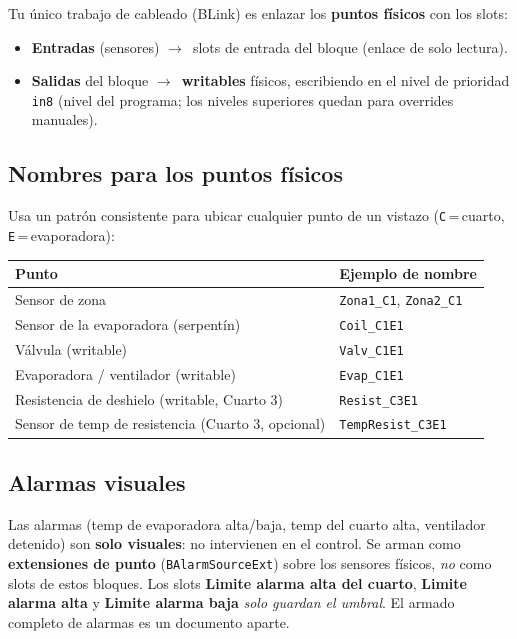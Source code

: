 \documentclass[11pt,a4paper]{article}
\newcommand{\ra}{\textcolor{frio}{$\rightarrow$}}
\newcommand{\slot}[1]{\textbf{#1}}
\newcommand{\code}[1]{\texttt{#1}}
\newcommand{\cabfila}{\color{white}\bfseries}
\begin{document}
\noindent Tu único trabajo de cableado (BLink) es enlazar los \textbf{puntos físicos} con los slots:
\begin{itemize}[leftmargin=1.4em,itemsep=2pt]
  \item \textbf{Entradas} (sensores) \ra\ slots de entrada del bloque (enlace de solo lectura).
  \item \textbf{Salidas} del bloque \ra\ \textbf{writables} físicos, escribiendo en el nivel de
        prioridad \code{in8} (nivel del programa; los niveles superiores quedan para overrides manuales).
\end{itemize}

\subsection{Nombres para los puntos físicos}
Usa un patrón consistente para ubicar cualquier punto de un vistazo (\code{C}\,=\,cuarto, \code{E}\,=\,evaporadora):

\begin{center}\small
\begin{tabular}{L{6.5cm} L{6.5cm}}
\toprule
{}\cabfila \textbf{Punto} & \cabfila \textbf{Ejemplo de nombre} \\
\midrule
{}Sensor de zona & \code{Zona1_C1}, \code{Zona2_C1} \\
Sensor de la evaporadora (serpentín) & \code{Coil_C1E1} \\
Válvula (writable) & \code{Valv_C1E1} \\
Evaporadora / ventilador (writable) & \code{Evap_C1E1} \\
Resistencia de deshielo (writable, Cuarto 3) & \code{Resist_C3E1} \\
Sensor de temp de resistencia (Cuarto 3, opcional) & \code{TempResist_C3E1} \\
\bottomrule
\end{tabular}
\end{center}

\subsection{Alarmas visuales}
\begin{nota}
Las alarmas (temp de evaporadora alta/baja, temp del cuarto alta, ventilador detenido) son
\textbf{solo visuales}: no intervienen en el control. Se arman como \textbf{extensiones de punto}
(\code{BAlarmSourceExt}) sobre los sensores físicos, \emph{no} como slots de estos bloques.
Los slots \slot{Limite alarma alta del cuarto}, \slot{Limite alarma alta} y \slot{Limite alarma baja}
\emph{solo guardan el umbral}. El armado completo de alarmas es un documento aparte.
\end{nota}
\end{document}
